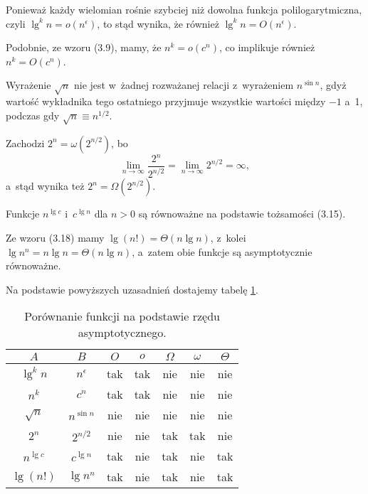 
\subproblem %
Ponieważ każdy wielomian rośnie szybciej niż dowolna funkcja polilogarytmiczna, czyli $\lg^kn=o(n^\epsilon)$, to stąd wynika, że również $\lg^kn=O(n^\epsilon)$.

\subproblem %
Podobnie, ze wzoru (3.9), mamy, że $n^k=o(c^n)$, co implikuje również $n^k=O(c^n)$.

\subproblem %
Wyrażenie $\sqrt{n}$ nie jest w~żadnej rozważanej relacji z~wyrażeniem $n^{\sin n}$, gdyż wartość wykładnika tego ostatniego przyjmuje wszystkie wartości między $-1$ a~1, podczas gdy $\sqrt{n}\equiv n^{1/2}$.

\subproblem %
Zachodzi $2^n=\omega(2^{n/2})$, bo
\[
	\lim_{n\to\infty}\frac{2^n}{2^{n/2}} = \lim_{n\to\infty}2^{n/2} = \infty,
\]
a~stąd wynika też $2^n=\Omega(2^{n/2})$.

\subproblem %
Funkcje $n^{\lg c}$ i~$c^{\lg n}$ dla $n>0$ są równoważne na podstawie tożsamości (3.15).

\subproblem %
Ze wzoru (3.18) mamy $\lg(n!)=\Theta(n\lg n)$, z~kolei $\lg n^n=n\lg n=\Theta(n\lg n)$, a~zatem obie funkcje są asymptotycznie równoważne.

\bigskip
\noindent Na podstawie powyższych uzasadnień dostajemy tabelę \ref{tab:3-2}.
\begin{table}[ht]
	\centering
		\begin{tabular}{cc|c|c|c|c|c}
			$A$ & $B$ & $O$ & $o$ & $\Omega$ & $\omega$ & $\Theta$ \\
			\hline
			$\lg^kn$ & $n^\epsilon$ & tak & tak & nie & nie & nie \\
			\hline
			$n^k$ & $c^n$ & tak & tak & nie & nie & nie \\
			\hline
			$\sqrt{n}$ & $n^{\sin n}$ & nie & nie & nie & nie & nie \\
			\hline
			$2^n$ & $2^{n/2}$ & nie & nie & tak & tak & nie \\
			\hline
			$n^{\lg c}$ & $c^{\lg n}$ & tak & nie & tak & nie & tak \\
			\hline
			$\lg(n!)$ & $\lg n^n$ & tak & nie & tak & nie & tak
		\end{tabular}
		\caption{Porównanie funkcji na podstawie rzędu asymptotycznego.} \label{tab:3-2}
\end{table}
